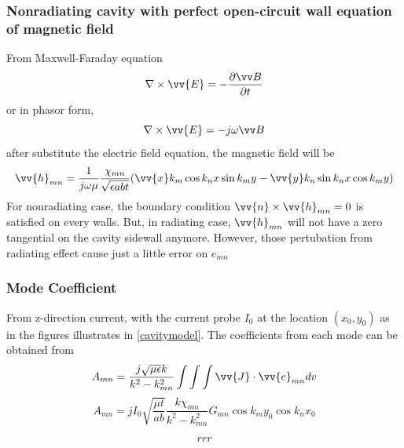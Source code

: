 \documentclass[11pt,a4paper]{article}
\begin{document}
      \subsubsection{Nonradiating cavity with perfect open-circuit wall equation of magnetic field}
        \indent From Maxwell-Faraday equation
        \begin{equation}
          \nabla \times \vv{E} = - \frac {\partial{\vv B}} {\partial t}
        \end{equation}
        \indent or in phasor form,
        \begin{equation}
          \nabla \times \vv{E} = -j\omega{\vv B}
        \end{equation}
        \indent after substitute the electric field equation, the magnetic field will be
        \begin{equation}
           \vv{h}_{mn} = \frac{1}{j\omega\mu}\frac{\chi_{mn}}{\sqrt{\epsilon abt}}(\vv{x}k_m\cos{k_nx}\sin{k_my} - \vv{y}k_n\sin{k_n}{x}\cos{k_m}{y})
        \end{equation}
        \indent For nonradiating case, the boundary condition $\vv{n} \times \vv{h}_{mn} = 0$ is satisfied on every walls.
                But, in radiating case, $\vv{h}_{mn}$ will not have a zero tangential on the cavity sidewall anymore.
                However, those pertubation from radiating effect cause just a little error on $e_{mn}$\cite{CaM:81}
      
      \subsubsection{Mode Coefficient}
        \indent From z-direction current, with the current probe $I_{0}$ at the location $(x_0,y_0)$ as in the
                figures illustrates in \ref{cavitymodel}. The coefficients from each mode can be obtained from
        \begin{equation}
          A_{mn} = \frac{j\sqrt{\mu\epsilon}k}{k^2-k_{mn}^2} \int\int\int\vv{J} \cdot \vv{e}_{mn} dv
        \end{equation}
        \begin{equation}
          A_{mn} = jI_0 \sqrt{\frac{\mu t}{ab}} \frac{k\chi_{mn}}{k^2-k_{mn}^2} G_{mn} \cos{k_my_0}\cos{k_nx_0}
        \end{equation}

        \begin{equation}
          rrr
        \end{equation}
\end{document}
